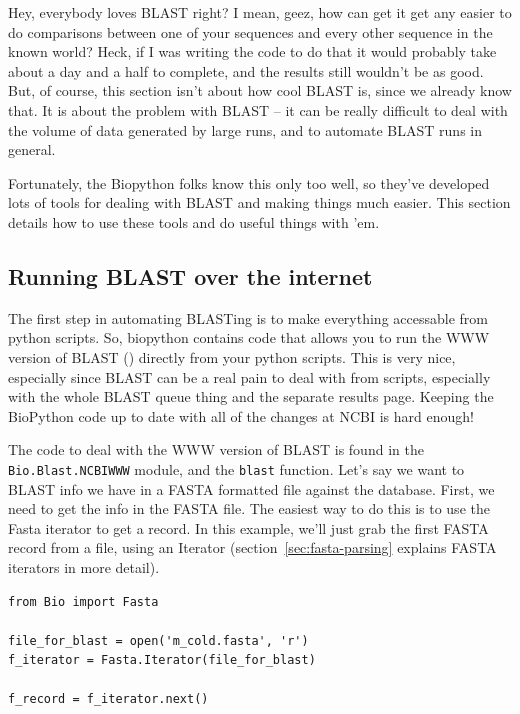 \documentclass{report}
\begin{document}
Hey, everybody loves BLAST right? I mean, geez, how can get it get any easier to do comparisons between one of your sequences and every other sequence in the known world? Heck, if I was writing the code to do that it would probably take about a day and a half to complete, and the results still wouldn't be as good. But, of course, this section isn't about how cool BLAST is, since we already know that. It is about the problem with BLAST -- it can be really difficult to deal with the volume of data generated by large runs, and to automate BLAST runs in general.


Fortunately, the Biopython folks know this only too well, so they've developed lots of tools for dealing with BLAST and making things much easier. This section details how to use these tools and do useful things with 'em. 

\subsection{Running BLAST over the internet}
\label{sec:running-www-blast}

The first step in automating BLASTing is to make everything accessable
from python scripts. So, biopython contains code that allows you to
run the WWW version of BLAST
() directly from
your python scripts. This is very nice, especially since BLAST can be
a real pain to deal with from scripts, especially with the whole BLAST
queue thing and the separate results page. Keeping the BioPython code
up to date with all of the changes at NCBI is hard enough!


The code to deal with the WWW version of BLAST is found in the
\verb|Bio.Blast.NCBIWWW| module, and the \verb|blast| function. Let's
say we want to BLAST info we have in a FASTA formatted file against
the database. First, we need to get the info in the FASTA file. The
easiest way to do this is to use the Fasta iterator to get a
record. In this example, we'll just grab the first FASTA record from a 
file, using an Iterator (section~\ref{sec:fasta-parsing} explains
FASTA iterators in more detail).


\begin{verbatim}
from Bio import Fasta

file_for_blast = open('m_cold.fasta', 'r')
f_iterator = Fasta.Iterator(file_for_blast)

f_record = f_iterator.next()
\end{verbatim}
\end{document}
